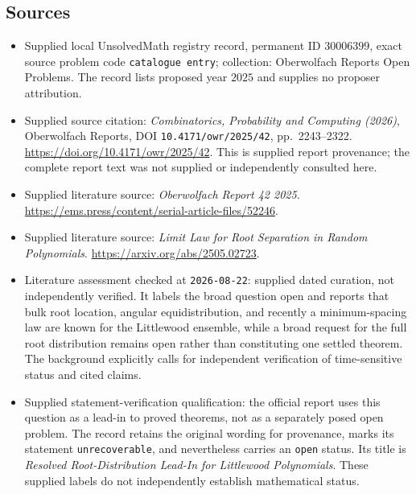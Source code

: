 \documentclass[11pt]{article}
\begin{document}
\subsection{Sources}
\begin{itemize}
\item Supplied local UnsolvedMath registry record, permanent ID \(30006399\), exact source problem code \texttt{catalogue entry}; collection: Oberwolfach Reports Open Problems. The record lists proposed year \(2025\) and supplies no proposer attribution.
\item Supplied source citation: \emph{Combinatorics, Probability and Computing (2026)}, Oberwolfach Reports, DOI \texttt{10.4171/owr/2025/42}, pp.\ 2243--2322. \url{https://doi.org/10.4171/owr/2025/42}. This is supplied report provenance; the complete report text was not supplied or independently consulted here.
\item Supplied literature source: \emph{Oberwolfach Report 42 2025}. \url{https://ems.press/content/serial-article-files/52246}.
\item Supplied literature source: \emph{Limit Law for Root Separation in Random Polynomials}. \url{https://arxiv.org/abs/2505.02723}.
\item Literature assessment checked at \texttt{2026-08-22}: supplied dated curation, not independently verified. It labels the broad question open and reports that bulk root location, angular equidistribution, and recently a minimum-spacing law are known for the Littlewood ensemble, while a broad request for the full root distribution remains open rather than constituting one settled theorem. The background explicitly calls for independent verification of time-sensitive status and cited claims.
\item Supplied statement-verification qualification: the official report uses this question as a lead-in to proved theorems, not as a separately posed open problem. The record retains the original wording for provenance, marks its statement \texttt{unrecoverable}, and nevertheless carries an \texttt{open} status. Its title is \emph{Resolved Root-Distribution Lead-In for Littlewood Polynomials}. These supplied labels do not independently establish mathematical status.
\end{itemize}
\end{document}
